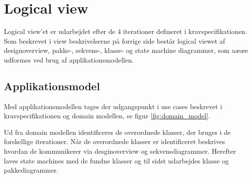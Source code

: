 \section{Logical view}
\vspace{-0.4cm}
Logical view'et er udarbejdet efter de 4 iterationer defineret i kravspecifikationen. Som beskrevet i view beskrivelserne på forrige side består logical viewet af designoverview, pakke-, sekvens-, klasse- og state machine diagrammer, som aææe udformes ved brug af applikationsmodellen.

\subsection{Applikationsmodel}
\vspace{-0.4cm}
Med applikationsmodellen tages der udgangspunkt i use cases beskrevet i kravspecifikationen og domain modellen, se figur \ref{fig:domain_model}.
  
Ud fra domain modellen identificeres de overordnede klasser, der bruges i de forskellige iterationer. Når de overordnede klasser er identificeret beskrives hvordan de kommunikerer via desginoverview og sekvensdiagrammer. Herefter laves state machines med de fundne klasser og til sidst udarbejdes klasse og pakkediagrammer.




\newpage
%

\newpage
%

\newpage
%